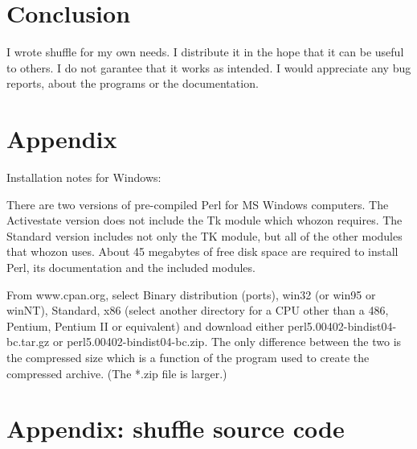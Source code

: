 \documentclass[doc]{apa}
\begin{document}
  

\section*{Conclusion}

I wrote shuffle for my own needs. I distribute it in the hope that it can be
useful to others. I do not garantee that it works as intended. I would
appreciate any bug reports, about the programs or the documentation.


\section*{Appendix}

Installation notes for Windows:

There are two versions of pre-compiled Perl for MS Windows computers. The
Activestate version does not include the Tk module which whozon requires. The
Standard version includes not only the TK module, but all of the other modules
that whozon uses. About 45 megabytes of free disk space are required to
install Perl, its documentation and the included modules.

From www.cpan.org, select Binary distribution (ports), win32 (or win95 or
winNT), Standard, x86 (select another directory for a CPU other than a 486,
Pentium, Pentium II or equivalent) and download either
perl5.00402-bindist04-bc.tar.gz or perl5.00402-bindist04-bc.zip. The only
difference between the two is the compressed size which is a function of the
program used to create the compressed archive. (The *.zip file is larger.)





\newpage
\section*{Appendix: shuffle source code}

\end{document}
